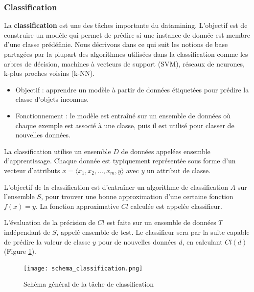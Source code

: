 \documentclass[a4paper,12pt]{article}
\begin{document}
        \subsubsection{Classification}
        
        La \textbf{classification} est une des tâches importante du datamining. L’objectif est de construire un modèle qui permet de prédire si une instance de donnée est membre d’une classe prédéfinie.  Nous décrivons dans ce qui suit les notions de base partagées par la plupart des algorithmes utilisées dans la classification comme les arbres de décision, machines à vecteurs de support (SVM), réseaux de neurones, k-plus proches voisins (k-NN).



            \begin{itemize}
                \item  Objectif : apprendre un modèle à partir de données étiquetées pour prédire la classe d’objets inconnus.
                \item  Fonctionnement : le modèle est entraîné sur un ensemble de données où chaque exemple est associé à une classe, puis il est utilisé pour classer de nouvelles données.\\
            \end{itemize}
            La classification utilise un ensemble $D$ de données appelées ensemble d’apprentissage. Chaque donnée est typiquement représentée sous forme d’un vecteur d’attributs 
            $x = \langle x_1, x_2, \dots, x_m, y \rangle$ avec $y$ un attribut de classe. 
            
            L’objectif de la classification est d’entraîner un algorithme de classification $A$ sur l’ensemble $S$, pour trouver une bonne approximation d’une certaine fonction $f(x) = y$. La fonction approximative $Cl$ calculée est appelée classifieur. 
            
            L’évaluation de la précision de $Cl$ est faite sur un ensemble de données $T$ indépendant de $S$, appelé ensemble de test. Le classifieur sera par la suite capable de prédire la valeur de classe $y$ pour de nouvelles données $d$, en calculant $Cl(d)$ (Figure \ref{fig:classification}).
            
            \begin{figure}[h]
                \centering
                \texttt{[image: schema\_classification.png]}
                \caption{Schéma général de la tâche de classification}
                \label{fig:classification}
            \end{figure}
        
\end{document}
